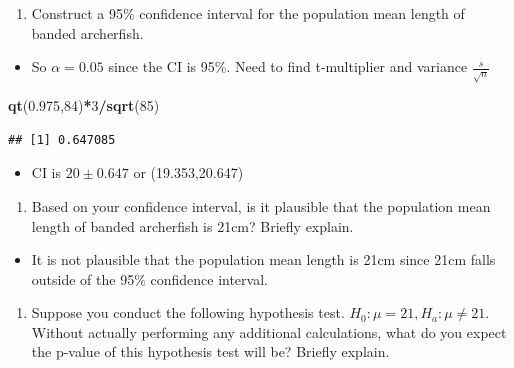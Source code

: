 \documentclass[
  openany]{book}
\newenvironment{Shaded}{\begin{snugshade}}{\end{snugshade}}
\newcommand{\DecValTok}[1]{\textcolor[rgb]{0.00,0.00,0.81}{#1}}
\newcommand{\FloatTok}[1]{\textcolor[rgb]{0.00,0.00,0.81}{#1}}
\newcommand{\FunctionTok}[1]{\textcolor[rgb]{0.13,0.29,0.53}{\textbf{#1}}}
\newcommand{\NormalTok}[1]{#1}
\newcommand{\SpecialCharTok}[1]{\textcolor[rgb]{0.81,0.36,0.00}{\textbf{#1}}}
\providecommand{\tightlist}{%
  \setlength{\itemsep}{0pt}\setlength{\parskip}{0pt}}
\begin{document}
\begin{enumerate}
\def\labelenumi{\alph{enumi}.}
\tightlist
\item
  Construct a 95\% confidence interval for the population mean length of banded archerfish.
\end{enumerate}

\begin{itemize}
\tightlist
\item
  So \(\alpha = 0.05\) since the CI is 95\%. Need to find t-multiplier and variance \(\frac{s}{\sqrt{n}}\)
\end{itemize}

\begin{Shaded}
\begin{Highlighting}[]
\FunctionTok{qt}\NormalTok{(}\FloatTok{0.975}\NormalTok{,}\DecValTok{84}\NormalTok{)}\SpecialCharTok{*}\DecValTok{3}\SpecialCharTok{/}\FunctionTok{sqrt}\NormalTok{(}\DecValTok{85}\NormalTok{)}
\end{Highlighting}
\end{Shaded}

\begin{verbatim}
## [1] 0.647085
\end{verbatim}

\begin{itemize}
\tightlist
\item
  CI is \(20\pm 0.647\) or (19.353,20.647)
\end{itemize}

\begin{enumerate}
\def\labelenumi{\alph{enumi}.}
\setcounter{enumi}{1}
\tightlist
\item
  Based on your confidence interval, is it plausible that the population mean length of banded archerfish is 21cm? Briefly explain.
\end{enumerate}

\begin{itemize}
\tightlist
\item
  It is not plausible that the population mean length is 21cm since 21cm falls outside of the 95\% confidence interval.
\end{itemize}

\begin{enumerate}
\def\labelenumi{\alph{enumi}.}
\setcounter{enumi}{2}
\tightlist
\item
  Suppose you conduct the following hypothesis test. \(H_0: \mu=21,H_a:\mu \ne 21\). Without actually performing any additional calculations, what do you expect the p-value of this hypothesis test will be? Briefly explain.
\end{enumerate}
\end{document}
